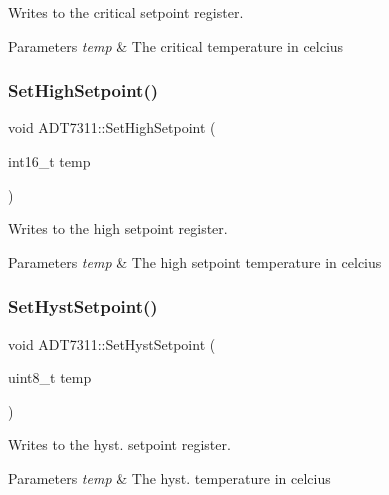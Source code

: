 Writes to the critical setpoint register. 


\begin{DoxyParams}{Parameters}
{\em temp} & The critical temperature in celcius \\
\hline
\end{DoxyParams}
\mbox{\label{classcubesat_1_1ADT7311_a6e2fef4825d733d11fed423e0c19edcd}} 
\subsubsection{\texorpdfstring{Set\+High\+Setpoint()}{SetHighSetpoint()}}
{\footnotesize\ttfamily void A\+D\+T7311\+::\+Set\+High\+Setpoint (\begin{DoxyParamCaption}\item[{int16\+\_\+t}]{temp }\end{DoxyParamCaption})}



Writes to the high setpoint register. 


\begin{DoxyParams}{Parameters}
{\em temp} & The high setpoint temperature in celcius \\
\hline
\end{DoxyParams}
\mbox{\label{classcubesat_1_1ADT7311_a769bd9152682b5ebd7408d1796116b71}} 
\subsubsection{\texorpdfstring{Set\+Hyst\+Setpoint()}{SetHystSetpoint()}}
{\footnotesize\ttfamily void A\+D\+T7311\+::\+Set\+Hyst\+Setpoint (\begin{DoxyParamCaption}\item[{uint8\+\_\+t}]{temp }\end{DoxyParamCaption})}



Writes to the hyst. setpoint register. 


\begin{DoxyParams}{Parameters}
{\em temp} & The hyst. temperature in celcius \\
\hline
\end{DoxyParams}
\mbox{\label{classcubesat_1_1ADT7311_a52ef57ca7df4c0f53ed0f98be1c1defd}} 
